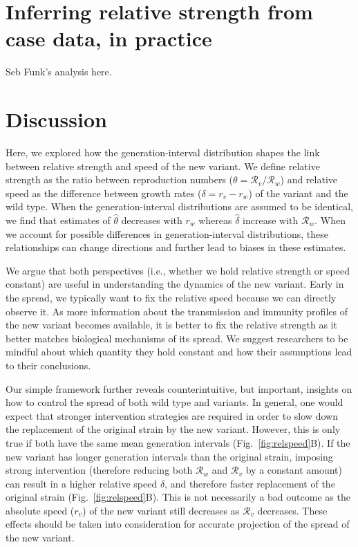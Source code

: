 \documentclass[12pt]{article}
\newcommand{\fref}[1]{Fig.~\ref{fig:#1}}
\newcommand{\RR}{\ensuremath{{\mathcal R}}\xspace}
\begin{document}
\section{Inferring relative strength from case data, in practice}

Seb Funk's analysis here.

\section{Discussion}

Here, we explored how the generation-interval distribution shapes the link between relative strength and speed of the new variant.
We define relative strength as the ratio between reproduction numbers ($\theta=\RR_v/\RR_w$) and relative speed as the difference between growth rates ($\delta=r_v-r_w$) of the variant and the wild type.
When the generation-interval distributions are assumed to be identical, we find that estimates of $\hat{\theta}$ decreases with $r_w$ whereas $\hat{\delta}$ increase with $\RR_w$.
When we account for possible differences in generation-interval distributions, these relationships can change directions and further lead to biases in these estimates.

We argue that both perspectives (i.e., whether we hold relative strength or speed constant) are useful in understanding the dynamics of the new variant.
Early in the spread, we typically want to fix the relative speed because we can directly observe it.
As more information about the transmission and immunity profiles of the new variant becomes available, it is better to fix the relative strength as it better matches biological mechanisms of its spread.
We suggest researchers to be mindful about which quantity they hold constant and how their assumptions lead to their conclusions.

Our simple framework further reveals counterintuitive, but important, insights on how to control the spread of both wild type and variants.
In general, one would expect that stronger intervention strategies are required in order to slow down the replacement of the original strain by the new variant.
However, this is only true if both have the same mean generation intervals (\fref{relspeed}B).
If the new variant has longer generation intervals than the original strain, imposing strong intervention (therefore reducing both $\RR_w$ and $\RR_v$ by a constant amount) can result in a higher relative speed $\delta$, and therefore faster replacement of the original strain (\fref{relspeed}B).
This is not necessarily a bad outcome as the absolute speed ($r_v$) of the new variant still decreases as $\RR_v$ decreases.
These effects should be taken into consideration for accurate projection of the spread of the new variant.
\end{document}
